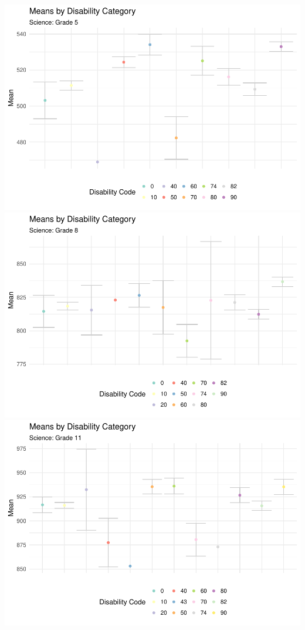 \documentclass[]{article}
\begin{document}
\includegraphics{tech_report_18_files/figure-latex/sci_plots5811-1.pdf}
\includegraphics{tech_report_18_files/figure-latex/sci_plots5811-2.pdf}
\includegraphics{tech_report_18_files/figure-latex/sci_plots5811-3.pdf}
\end{document}
